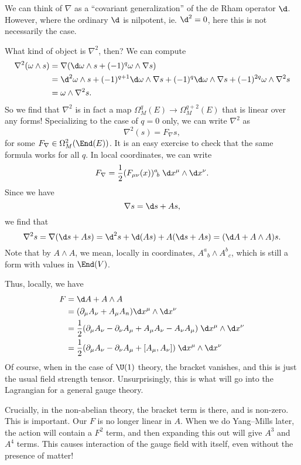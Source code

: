\documentclass[a4paper]{article}
\begin{document}
We can think of $\nabla$ as a ``covariant generalization'' of the de Rham operator $\d$. However, where the ordinary $\d$ is nilpotent, ie. $\d^2 = 0$, here this is not necessarily the case.

What kind of object is $\nabla^2$, then? We can compute
\begin{align*}
  \nabla^2 (\omega \wedge s) &= \nabla(\d \omega \wedge s + (-1)^q \omega \wedge \nabla s)\\
  &= \d^2 \omega \wedge s + (-1)^{q + 1}\d \omega \wedge \nabla s + (-1)^q \d \omega \wedge \nabla s + (-1)^{2q} \omega \wedge \nabla^2 s\\
  &= \omega \wedge \nabla^2 s.
\end{align*}
So we find that $\nabla^2$ is in fact a map $\Omega^q_M(E) \to \Omega^{q + 2}_M(E)$ that is linear over any forms! Specializing to the case of $q = 0$ only, we can write $\nabla^2$ as
\[
  \nabla^2(s) = F_\nabla s,
\]
for some $F_\nabla \in \Omega^2_M(\End(E))$. It is an easy exercise to check that the same formula works for all $q$. In local coordinates, we can write
\[
  F_\nabla = \frac{1}{2} (F_{\mu\nu}(x))^a\!_b\; \d x^\mu \wedge \d x^\nu.
\]
Since we have
\[
  \nabla s = \d s + A s,
\]
we find that
\[
  \nabla^2 s = \nabla(\d s + A s) = \d^2 s + \d (As) + A(\d s + A s) = (\d A + A \wedge A) s.
\]
Note that by $A\wedge A$, we mean, locally in coordinates, $A^a\!_b \wedge A^b\!_c$, which is still a form with values in $\End(V)$.

Thus, locally, we have
\begin{align*}
  F &= \d A + A \wedge A \\
  &= (\partial_\mu A_\nu + A_\mu A_n) \d x^\mu \wedge \d x^\nu\\
  &= \frac{1}{2} (\partial_\mu A_\nu - \partial_\nu A_\mu + A_\mu A_\nu - A_\nu A_\mu)\;\d x^\mu \wedge \d x^\nu\\
  &= \frac{1}{2} (\partial_\mu A_\nu - \partial_\nu A_\mu + [A_\mu, A_\nu])\; \d x^\mu \wedge \d x^\nu
\end{align*}
Of course, when in the case of $\U(1)$ theory, the bracket vanishes, and this is just the usual field strength tensor. Unsurprisingly, this is what will go into the Lagrangian for a general gauge theory.

Crucially, in the non-abelian theory, the bracket term is there, and is non-zero. This is important. Our $F$ is no longer linear in $A$. When we do Yang--Mills later, the action will contain a $F^2$ term, and then expanding this out will give $A^3$ and $A^4$ terms. This causes interaction of the gauge field with itself, even without the presence of matter!
\end{document}
